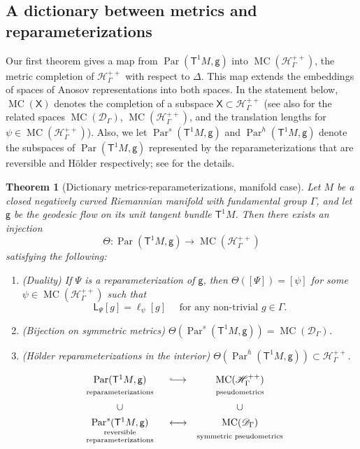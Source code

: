 \documentclass[twoside]{amsart}
\newtheorem{mainthm}{Theorem}
\theoremstyle{definition}
\numberwithin{equation}{section}
\numberwithin{theorem}{section}
\newcommand{\msf}[1]{\mathsf{#1}}
\newcommand{\calD}{\mathcal{D}}
\newcommand{\calH}{\mathcal{H}}
\newcommand{\scrD}{\mathscr{D}}
\newcommand{\scrH}{\mathscr{H}}
\newcommand{\G}{\Gamma}
\newcommand{\Del}{\Delta}
\newcommand{\Thet}{\Theta}
\newcommand{\p}{\psi}
\DeclareMathOperator{\Par}{Par}
\newcommand{\ra}{\rightarrow}
\newcommand{\longhookrightarrow}{\lhook\joinrel\relbar\joinrel\rightarrow}
\DeclareMathOperator{\MC}{MC}
\newcommand{\vg}{\msf{g}}
\newcommand{\sfP}{\mathsf{\Psi}}
\begin{document}
\subsection{A dictionary between metrics and reparameterizations}\label{subsec:introdictionary} Our first theorem gives a map from $\Par(\msf{T}^1 M,\msf{g})$ into $\MC(\scrH_\G^{++})$, the metric completion of $\scrH_\G^{++}$ with respect to $\Del$. This map extends the embeddings of spaces of Anosov representations into both spaces. In the statement below, $\MC(\msf{X})$ denotes the completion of a subspace $\msf{X}\subset \scrH_\G^{++}$ (see also  for the related spaces $\MC(\calD_\G)$, $\MC(\calH_\G^{++})$, and the translation lengths for $\p\in \MC(\calH_\G^{++})$). Also, we let $\Par^s(\msf{T}^1M,\msf{g})$ and $\Par^h(\msf{T}^1M,\msf{g})$ denote the subspaces of $\Par(\msf{T}^1M,\msf{g})$ represented by the reparameterizations that are reversible and H\"older respectively; see  for the details.

\begin{mainthm}[Dictionary metrics-reparameterizations,  manifold case]\label{mainthm:dictionary_manifold}
    Let $M$ be a closed negatively curved Riemannian manifold with fundamental group $\G$, and let $\msf{g}$ be the geodesic flow on its unit tangent bundle $\msf{T}^1M$. Then there exists an injection \begin{equation*}%
        \Thet:\Par(\msf{T}^1M,\msf{g}) \ra \MC(\scrH^{++}_\G)
    \end{equation*} satisfying the following:
    \begin{enumerate}
    \item (Duality) If $\sfP$ is a reparameterization of $\vg$, then $\Thet([\sfP])=[\psi]$ for some $\psi\in \MC(\calH^{++}_\G)$ such that 
    \[\msf{L}_{\sfP}[g]=\ell_{\p}[g] \quad \text{ for any non-trivial }g\in \G.\]
    \item (Bijection on symmetric metrics) $\Thet(\Par^s(\msf{T}^1M,\msf{g}))=\MC(\scrD_\G)$.
    \item (H\"older reparameterizations in the interior) $\Thet(\Par^h(\msf{T}^1M,\msf{g}))\subset \scrH_\G^{++}$.
    \end{enumerate}
\end{mainthm}
\begin{table}[ht]
\centering
\[
\begin{array}{ccc}
\Par(\mathsf{T}^1M,\msf{g}) 
& \longhookrightarrow 
& \MC(\scrH^{++}_\Gamma) \\
\scriptstyle \text{reparameterizations} && \scriptstyle \text{pseudometrics} \\[0.4em]
\cup && \cup \\[0.4em]
\Par^s(\mathsf{T}^1M,\msf{g}) 
& \longleftrightarrow 
& \MC(\scrD_\Gamma) \\
\text{\scriptsize
\begin{tabular}{c}
reversible \\
reparameterizations
\end{tabular}}
&& 
\scriptstyle \text{symmetric pseudometrics}
\end{array}
\]
\caption{Inclusions given by .}
\end{table}
\end{document}

